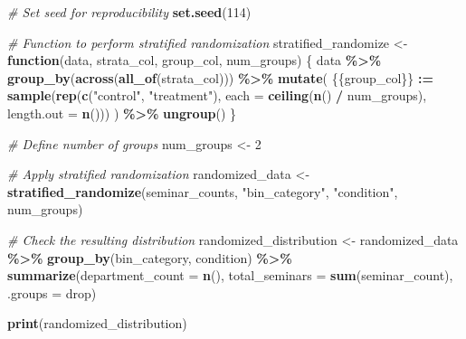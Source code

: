 \documentclass[
]{article}
\newenvironment{Shaded}{\begin{snugshade}}{\end{snugshade}}
\newcommand{\AttributeTok}[1]{\textcolor[rgb]{0.13,0.29,0.53}{#1}}
\newcommand{\CommentTok}[1]{\textcolor[rgb]{0.56,0.35,0.01}{\textit{#1}}}
\newcommand{\ControlFlowTok}[1]{\textcolor[rgb]{0.13,0.29,0.53}{\textbf{#1}}}
\newcommand{\DecValTok}[1]{\textcolor[rgb]{0.00,0.00,0.81}{#1}}
\newcommand{\FunctionTok}[1]{\textcolor[rgb]{0.13,0.29,0.53}{\textbf{#1}}}
\newcommand{\NormalTok}[1]{#1}
\newcommand{\OtherTok}[1]{\textcolor[rgb]{0.56,0.35,0.01}{#1}}
\newcommand{\SpecialCharTok}[1]{\textcolor[rgb]{0.81,0.36,0.00}{\textbf{#1}}}
\newcommand{\StringTok}[1]{\textcolor[rgb]{0.31,0.60,0.02}{#1}}
\begin{document}
\begin{Shaded}
\begin{Highlighting}[]
\CommentTok{\# Set seed for reproducibility}
\FunctionTok{set.seed}\NormalTok{(}\DecValTok{114}\NormalTok{)}

\CommentTok{\# Function to perform stratified randomization}
\NormalTok{stratified\_randomize }\OtherTok{\textless{}{-}} \ControlFlowTok{function}\NormalTok{(data, strata\_col, group\_col, num\_groups) \{}
\NormalTok{  data }\SpecialCharTok{\%\textgreater{}\%}
    \FunctionTok{group\_by}\NormalTok{(}\FunctionTok{across}\NormalTok{(}\FunctionTok{all\_of}\NormalTok{(strata\_col))) }\SpecialCharTok{\%\textgreater{}\%}
    \FunctionTok{mutate}\NormalTok{(}
\NormalTok{      \{\{group\_col\}\} }\SpecialCharTok{:=} \FunctionTok{sample}\NormalTok{(}\FunctionTok{rep}\NormalTok{(}\FunctionTok{c}\NormalTok{(}\StringTok{"control"}\NormalTok{, }\StringTok{"treatment"}\NormalTok{), }\AttributeTok{each =} \FunctionTok{ceiling}\NormalTok{(}\FunctionTok{n}\NormalTok{() }\SpecialCharTok{/}\NormalTok{ num\_groups), }\AttributeTok{length.out =} \FunctionTok{n}\NormalTok{()))}
\NormalTok{    ) }\SpecialCharTok{\%\textgreater{}\%}
    \FunctionTok{ungroup}\NormalTok{()}
\NormalTok{\}}

\CommentTok{\# Define number of groups}
\NormalTok{num\_groups }\OtherTok{\textless{}{-}} \DecValTok{2}

\CommentTok{\# Apply stratified randomization}
\NormalTok{randomized\_data }\OtherTok{\textless{}{-}} \FunctionTok{stratified\_randomize}\NormalTok{(seminar\_counts, }\StringTok{"bin\_category"}\NormalTok{, }\StringTok{"condition"}\NormalTok{, num\_groups)}

\CommentTok{\# Check the resulting distribution}
\NormalTok{randomized\_distribution }\OtherTok{\textless{}{-}}\NormalTok{ randomized\_data }\SpecialCharTok{\%\textgreater{}\%}
  \FunctionTok{group\_by}\NormalTok{(bin\_category, condition) }\SpecialCharTok{\%\textgreater{}\%}
  \FunctionTok{summarize}\NormalTok{(}\AttributeTok{department\_count =} \FunctionTok{n}\NormalTok{(), }\AttributeTok{total\_seminars =} \FunctionTok{sum}\NormalTok{(seminar\_count), }\AttributeTok{.groups =} \StringTok{\textquotesingle{}drop\textquotesingle{}}\NormalTok{)}

\FunctionTok{print}\NormalTok{(randomized\_distribution)}
\end{Highlighting}
\end{Shaded}
\end{document}

